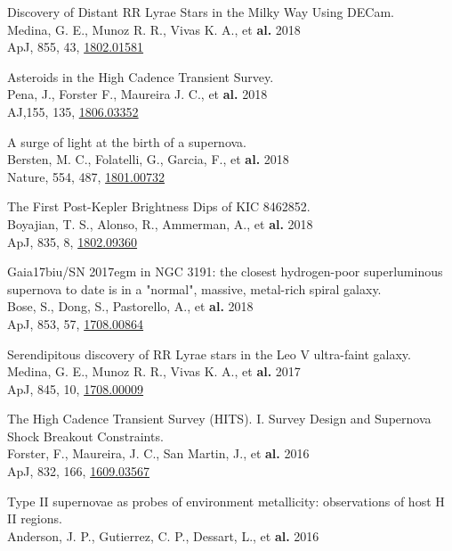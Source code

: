 \documentclass[12pt]{article}
\begin{document}
\begin{bibenum}
    \item 
Discovery of Distant RR Lyrae Stars in the Milky Way Using DECam.\\
Medina, G. E., Munoz R. R., Vivas K. A., et \textbf{al.} 2018\\
ApJ, 855, 43, \href{https://arxiv.org/abs/1802.01581}{1802.01581}
    \item 
Asteroids in the High Cadence Transient Survey.\\
Pena, J., Forster F., Maureira J. C., et \textbf{al.} 2018\\
AJ,155, 135, \href{https://arxiv.org/abs/1806.03352}{1806.03352}
    \item 	
A surge of light at the birth of a supernova.\\
Bersten, M. C., Folatelli, G., Garcia, F., et \textbf{al.} 2018\\
Nature, 554, 487, \href{https://arxiv.org/abs/1801.00732}{1801.00732}
    \item 	
The First Post-Kepler Brightness Dips of KIC 8462852.\\
Boyajian, T. S., Alonso, R., Ammerman, A., et \textbf{al.} 2018\\
ApJ, 835, 8, \href{https://arxiv.org/abs/1802.09360}{1802.09360}
    \item 	
Gaia17biu/SN 2017egm in NGC 3191: the closest hydrogen-poor superluminous supernova to date is in a "normal", massive, metal-rich spiral galaxy.\\
Bose, S., Dong, S., Pastorello, A., et \textbf{al.} 2018\\
ApJ, 853, 57, \href{https://arxiv.org/abs/1708.00864}{1708.00864}
    \item 
Serendipitous discovery of RR Lyrae stars in the Leo V ultra-faint galaxy.\\
Medina, G. E., Munoz R. R., Vivas K. A., et \textbf{al.} 2017\\
ApJ, 845, 10, \href{https://arxiv.org/abs/1708.00009}{1708.00009}
    \item 
The High Cadence Transient Survey (HITS). I. Survey Design and Supernova Shock Breakout Constraints.\\
Forster, F., Maureira, J. C., San Martin, J., et \textbf{al.} 2016\\
ApJ, 832, 166, \href{https://arxiv.org/abs/1609.03567}{1609.03567}
    \item 
Type II supernovae as probes of environment metallicity: observations of host H II regions.\\
Anderson, J. P., Gutierrez, C. P., Dessart, L., et \textbf{al.} 2016\\

\end{bibenum}
\end{document}
